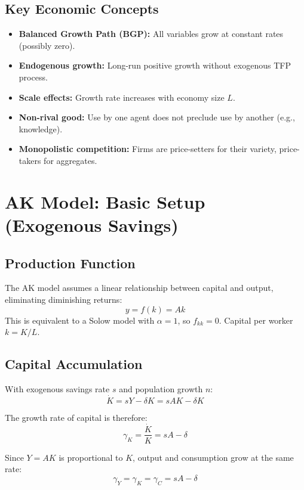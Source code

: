 \documentclass[a4paper,11pt]{article}
\begin{document}
\subsection*{Key Economic Concepts}
\begin{itemize}
    \item \textbf{Balanced Growth Path (BGP):} All variables grow at constant rates (possibly zero).
    \item \textbf{Endogenous growth:} Long-run positive growth without exogenous TFP process.
    \item \textbf{Scale effects:} Growth rate increases with economy size $L$.
    \item \textbf{Non-rival good:} Use by one agent does not preclude use by another (e.g., knowledge).
    \item \textbf{Monopolistic competition:} Firms are price-setters for their variety, price-takers for aggregates.
\end{itemize}

\clearpage

\section{AK Model: Basic Setup (Exogenous Savings)}

\subsection*{Production Function}

The AK model assumes a linear relationship between capital and output, eliminating diminishing returns:
\[
y = f(k) = Ak
\]
This is equivalent to a Solow model with $\alpha = 1$, so $f_{kk} = 0$. Capital per worker $k = K/L$.

\subsection*{Capital Accumulation}

With exogenous savings rate $s$ and population growth $n$:
\[
\dot{K} = sY - \delta K = sAK - \delta K
\]

The growth rate of capital is therefore:
\[
\gamma_K = \frac{\dot{K}}{K} = sA - \delta
\]

Since $Y = AK$ is proportional to $K$, output and consumption grow at the same rate:
\[
\gamma_Y = \gamma_K = \gamma_C = sA - \delta
\]
\end{document}
